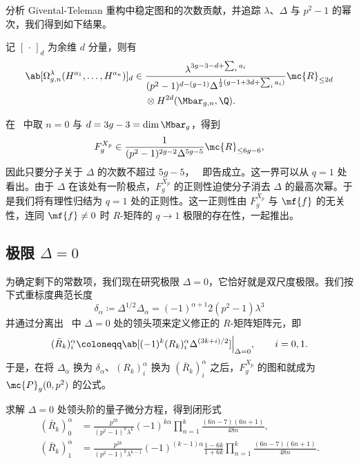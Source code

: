 分析 Givental-Teleman 重构中稳定图和的次数贡献，并追踪 \(\lambda\)、\(\Delta\) 与 \(p^2-1\) 的幂次，我们得到如下结果。

\begin{thm}%
\label{thm:local P1 reconstruction}
    记 \([\,\cdot\,]_d\) 为余维 \(d\) 分量，则有
    \begin{align*}
        \ab[\Omega^{\lambda}_{g,n}(H^{a_1},\ldots,H^{a_n})]_d \in{}& \frac{\lambda^{3g-3-d+\sum_i a_i}}{(p^2-1)^{d-(g-1)}\Delta^{\frac{1}{2}(g-1+3d+\sum_i a_i)}}\mc{R}_{\leq 2d} \\
        &\otimes H^{2d}(\Mbar_{g,n},\Q).
    \end{align*}
\end{thm}

在~ 中取 \(n=0\) 与 \(d = 3g-3 = \dim \Mbar_g\)，得到
\[ F_g^{X_p} \in \frac{1}{(p^2-1)^{2g-2}\Delta^{5g-5}}\mc{R}_{\leq 6g-6}, \]
因此只要分子关于 \(\Delta\) 的次数不超过 \(5g-5\)，~ 即告成立。这一界可以从 \(q=1\) 处看出。由于 \(\Delta\) 在该处有一阶极点，\(F_g^{X_p}\) 的正则性迫使分子消去 \(\Delta\) 的最高次幂。于是我们将有理性归结为 \(q=1\) 处的正则性。这一正则性由 \(F_g^{X_p}\) 与 \(\mf{f}\) 的无关性，连同 \(\mf{f} \neq 0\) 时 \(R\)-矩阵的 \(q \to 1\) 极限的存在性，一起推出。

\subsection{极限 \(\Delta = 0\)}%
\label{sub:The limit Delta = 0}

为确定剩下的常数项，我们现在研究极限 \(\Delta = 0\)，它恰好就是双尺度极限。我们按下式重标度典范长度
\[ \delta_{\alpha} \coloneqq \Delta^{1/2}\Delta_{\alpha} = (-1)^{\alpha+1}2(p^2-1)\lambda^3 \]
并通过分离出~ 中 \(\Delta = 0\) 处的领头项来定义修正的 \(R\)-矩阵矩阵元，即
\[ (\bar{R}_k)_i^{\alpha} \coloneqq \ab[(-1)^k (R_k)_i^{\alpha}\Delta^{(3k+i)/2}]\Big|_{\Delta=0}, \qquad i = 0,1. \]
于是，在将 \(\Delta_{\alpha}\) 换为 \(\delta_{\alpha}\)、\((R_k)_i^{\alpha}\) 换为 \((\bar{R}_k)_i^{\alpha}\) 之后，\(F_g^{X_p}\) 的图和就成为 \(\mc{P}_g(0,p^2)\) 的公式。

\begin{lem}%
\label{lem:R matrix at Delta zero}
    求解 \(\Delta = 0\) 处领头阶的量子微分方程，得到闭形式
    \begin{align*}
        (\bar{R}_k)_0^{\alpha} &= \frac{p^{2k}}{(p^2-1)^k\lambda^k}(-1)^{k\alpha}\prod_{n=1}^k \frac{(6n-7)(6n+1)}{48n}, \\
        (\bar{R}_k)_1^{\alpha} &= \frac{p^{2k}}{(p^2-1)^k \lambda^{k-1}}(-1)^{(k-1)\alpha}\frac{1-6k}{1+6k}\prod_{n=1}^k \frac{(6n-7)(6n+1)}{48n}.
    \end{align*}
\end{lem}

